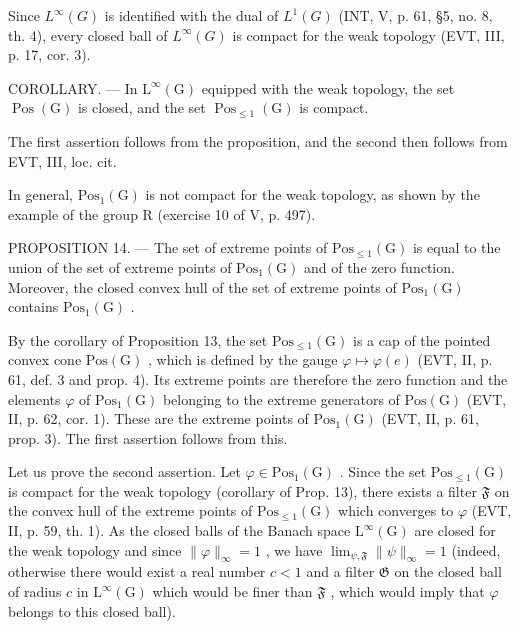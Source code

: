 Since \(L^{\infty}(G)\) is identified with the dual of \(L^{1}(G)\) (INT, V, p. 61, §5, no. 8, th. 4), every closed ball of \(L^{\infty}(G)\) is compact for the weak topology (EVT, III, p. 17, cor. 3).

COROLLARY. --- In \(\mathrm{L}^{\infty}(\mathrm{G})\) equipped with the weak topology, the set \(\operatorname{Pos}(\mathrm{G})\) is closed, and the set \(\operatorname{Pos}_{\leqslant 1}(\mathrm{G})\) is compact.

The first assertion follows from the proposition, and the second then follows from EVT, III, loc. cit.

In general, \(\mathrm{Pos}_{1}(\mathrm{G})\) is not compact for the weak topology, as shown by the example of the group R (exercise 10 of V, p. 497).

PROPOSITION 14. --- The set of extreme points of \(\mathrm{Pos}_{\leqslant 1}(\mathrm{G})\) is equal to the union of the set of extreme points of \(\mathrm{Pos}_1(\mathrm{G})\) and of the zero function. Moreover, the closed convex hull of the set of extreme points of \(\mathrm{Pos}_1(\mathrm{G})\) contains \(\mathrm{Pos}_1(\mathrm{G})\) .

By the corollary of Proposition 13, the set \(\mathrm{Pos}_{\leqslant 1}(\mathrm{G})\) is a cap of the pointed convex cone \(\mathrm{Pos}(\mathrm{G})\) , which is defined by the gauge \(\varphi \mapsto \varphi(e)\) (EVT, II, p. 61, def. 3 and prop. 4). Its extreme points are therefore the zero function and the elements \(\varphi\) of \(\mathrm{Pos}_1(\mathrm{G})\) belonging to the extreme generators of \(\mathrm{Pos}(\mathrm{G})\) (EVT, II, p. 62, cor. 1). These are the extreme points of \(\mathrm{Pos}_1(\mathrm{G})\) (EVT, II, p. 61, prop. 3). The first assertion follows from this.

Let us prove the second assertion. Let \(\varphi\in\mathrm{Pos}_{1}(\mathrm{G})\) . Since the set \(\mathrm{Pos}_{\leqslant 1}(\mathrm{G})\) is compact for the weak topology (corollary of Prop. 13), there exists a filter \(\mathfrak{F}\) on the convex hull of the extreme points of \(\mathrm{Pos}_{\leqslant 1}(\mathrm{G})\) which converges to \(\varphi\) (EVT, II, p. 59, th. 1). As the closed balls of the Banach space \(\mathrm{L}^{\infty}(\mathrm{G})\) are closed for the weak topology and since \(\|\varphi\|_{\infty}=1\) , we have \(\lim_{\psi,\mathfrak{F}}\|\psi\|_{\infty}=1\) (indeed, otherwise there would exist a real number \(c<1\) and a filter \(\mathfrak{G}\) on the closed ball of radius \(c\) in \(\mathrm{L}^{\infty}(\mathrm{G})\) which would be finer than \(\mathfrak{F}\) , which would imply that \(\varphi\) belongs to this closed ball).

